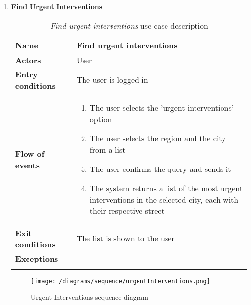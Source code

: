 \begin{enumerate}
				\FloatBarrier
			\item \textbf{Find Urgent Interventions}
				\begin{longtable}{p{0.26\linewidth}p{0.75\linewidth}}
					\toprule
					\textbf{Name} & \textbf{Find urgent interventions} \\
					\midrule
					\textbf{Actors} & User \\
					\midrule
					\textbf{Entry conditions} & The user is logged in \\
					\midrule
					\textbf{Flow of events} & 
					\begin{enumerate}
						\item The user selects the 'urgent interventions' option
						\item The user selects the region and the city from a list
						\item The user confirms the query and sends it
						\item The system returns a list of the most urgent interventions in the selected city, each with their respective street
					\end{enumerate} \\
					\midrule
					\textbf{Exit conditions} & The list is shown to the user\\
					\midrule
					\textbf{Exceptions} &  \\
					\bottomrule
					\caption{\emph{Find urgent interventions} use case description}
				\end{longtable}
			
				\newpage
			
				\begin{figure}[hbtp]
					\centering
					\texttt{[image: /diagrams/sequence/urgentInterventions.png]}
					\caption{Urgent Interventions sequence diagram}
				\end{figure}
			

\end{enumerate}
